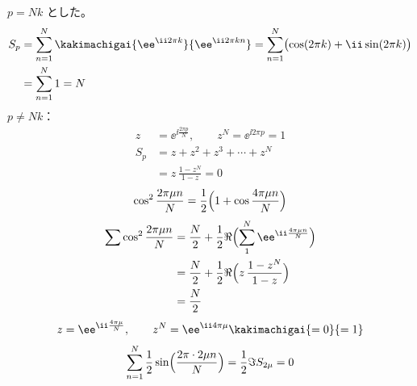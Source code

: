 $p=Nk$ とした。
\begin{align*}
  S_p&=\sum_{n=1}^{N}\kakimachigai{\ee^{\ii2\pi k}}{\ee^{\ii2\pi kn}}=\sum_{n=1}^{N}\bigl(\cos(2\pi k)+\ii\sin(2\pi k)\bigr)\\
  &=\sum_{n=1}^{N}1=N
\end{align*}
$p\neq Nk$：
\begin{align*}
  z&=\ee^{\ii\frac{2\pi p}{N}},\qquad z^{N}=\ee^{\ii2\pi p}=1\\
  S_p&=z+z^{2}+z^{3}+\cdots+z^{N}\\
  &=z\,\frac{1-z^{N}}{1-z}=0
\end{align*}
\[
  \cos^{2}\frac{2\pi\mu n}{N}=\frac{1}{2}\Bigl(1+\cos\frac{4\pi\mu n}{N}\Bigr)
\]
\begin{align*}
  \sum\cos^{2}\frac{2\pi\mu n}{N}&=\frac{N}{2}+\frac{1}{2}\Re\Bigl(\sum_{1}^{N}\ee^{\ii\frac{4\pi\mu n}{N}}\Bigr)\\
  &=\frac{N}{2}+\frac{1}{2}\Re\Bigl(z\,\frac{1-z^{N}}{1-z}\Bigr)\\
  &=\frac{N}{2}
\end{align*}
\[
  z=\ee^{\ii\frac{4\pi\mu}{N}},\qquad z^{N}=\ee^{\ii4\pi\mu}\kakimachigai{=0}{=1}
\]
\[
  \sum_{n=1}^{N}\frac{1}{2}\sin\Bigl(\frac{2\pi\cdot2\mu n}{N}\Bigr)=\frac{1}{2}\Im S_{2\mu}=0
\]
